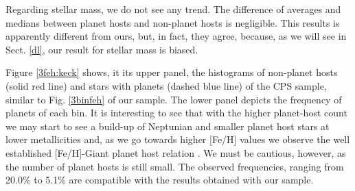 \documentclass[structabstract]{aa}
\begin{document}
Regarding stellar mass, we do not see any trend. The difference of averages and medians between planet hosts and non-planet hosts is negligible. This results is apparently different from ours, but, in fact, they agree, because, as we will see in Sect. \ref{dl}, our result for stellar mass is biased.

\begin{table}[h]
\centering
\caption{Difference of averages and medians between planet host and non-planet host distributions for the CPS late-K and M-type dwarf sample.}
\label{planets:keck}
\begin{center}
\end{center}
\end{table}

Figure \ref{3feh:keck} shows, it its upper panel, the histograms of non-planet hosts (solid red line) and stars with planets (dashed blue line) of the CPS sample, similar to Fig. \ref{3binfeh} of our sample. The lower panel depicts the frequency of planets of each bin. It is interesting to see that with the higher planet-host count we may start to see a build-up of Neptunian and smaller planet host stars at lower metallicities and, as we go towards higher [Fe/H] values we observe the well established [Fe/H]-Giant planet host relation \citep[e.g.][]{Santos-2004b,Fischer-2005}. We must be cautious, however, as the number of planet hosts is still small. The observed frequencies, ranging from 20.0\% to 5.1\% are compatible with the results obtained with our sample.
\end{document}
